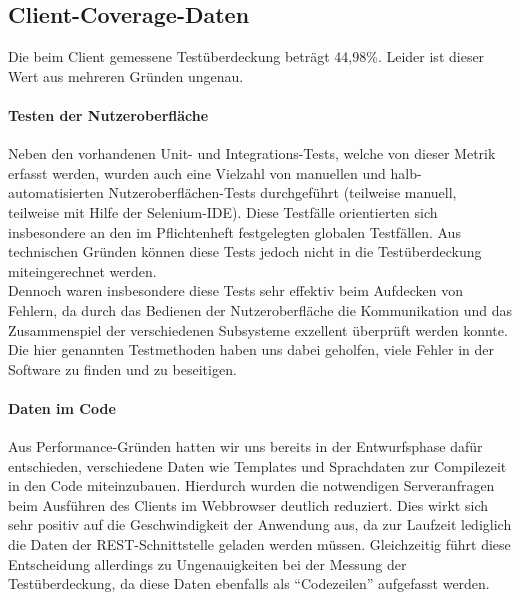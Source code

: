 \FloatBarrier
\subsection{Client-Coverage-Daten}
Die beim Client gemessene Testüberdeckung beträgt 44,98\%. Leider ist dieser Wert aus mehreren Gründen ungenau.
\paragraph{Testen der Nutzeroberfläche}
Neben den vorhandenen Unit- und Integrations-Tests, welche von dieser Metrik erfasst werden, wurden auch eine Vielzahl von manuellen und halb-automatisierten Nutzeroberflächen-Tests durchgeführt (teilweise manuell, teilweise mit Hilfe der Selenium-IDE). Diese Testfälle orientierten sich insbesondere an den im Pflichtenheft festgelegten globalen Testfällen. Aus technischen Gründen können diese Tests jedoch nicht in die Testüberdeckung miteingerechnet werden.\\
Dennoch waren insbesondere diese Tests sehr effektiv beim Aufdecken von Fehlern, da durch das Bedienen der Nutzeroberfläche die Kommunikation und das Zusammenspiel der verschiedenen Subsysteme exzellent überprüft werden konnte. Die hier genannten Testmethoden haben uns dabei geholfen, viele Fehler in der Software zu finden und zu beseitigen.
\paragraph{Daten im Code}
Aus Performance-Gründen hatten wir uns bereits in der Entwurfsphase dafür entschieden, verschiedene Daten wie Templates und Sprachdaten zur Compilezeit in den Code miteinzubauen. Hierdurch wurden die notwendigen Serveranfragen beim Ausführen des Clients im Webbrowser deutlich reduziert. Dies wirkt sich sehr positiv auf die Geschwindigkeit der Anwendung aus, da zur Laufzeit lediglich die Daten der REST-Schnittstelle geladen werden müssen. Gleichzeitig führt diese Entscheidung allerdings zu Ungenauigkeiten bei der Messung der Testüberdeckung, da diese Daten ebenfalls als \enquote{Codezeilen} aufgefasst werden.